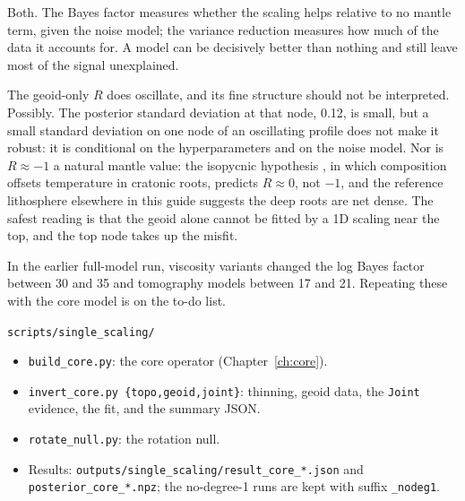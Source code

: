 \begin{defence}
\A Both.
The Bayes factor measures whether the scaling helps relative to no mantle term, given the noise model; the variance reduction measures how much of the data it accounts for.
A model can be decisively better than nothing and still leave most of the signal unexplained.

\A The geoid-only $R$ does oscillate, and its fine structure should not be interpreted.
Possibly. The posterior standard deviation at that node, 0.12, is small, but a small standard deviation on one node of an oscillating profile does not make it robust: it is conditional on the hyperparameters and on the noise model.
Nor is $R\approx-1$ a natural mantle value: the isopycnic hypothesis \citep{jordan1978composition}, in which composition offsets temperature in cratonic roots, predicts $R\approx0$, not $-1$, and the reference lithosphere elsewhere in this guide suggests the deep roots are net dense.
The safest reading is that the geoid alone cannot be fitted by a 1D scaling near the top, and the top node takes up the misfit.

\A In the earlier full-model run, viscosity variants changed the log Bayes factor between 30 and 35 and tomography models between 17 and 21.
Repeating these with the core model is on the to-do list.
\end{defence}

\begin{incode}{\texttt{scripts/single\_scaling/}}
\begin{itemize}[nosep]
\item \texttt{build\_core.py}: the core operator (Chapter~\ref{ch:core}).
\item \texttt{invert\_core.py \{topo,geoid,joint\}}: thinning, geoid data, the \texttt{Joint} evidence, the fit, and the summary JSON.
\item \texttt{rotate\_null.py}: the rotation null.
\item Results: \texttt{outputs/single\_scaling/result\_core\_*.json} and \texttt{posterior\_core\_*.npz}; the no-degree-1 runs are kept with suffix \texttt{\_nodeg1}.
\end{itemize}
\end{incode}
